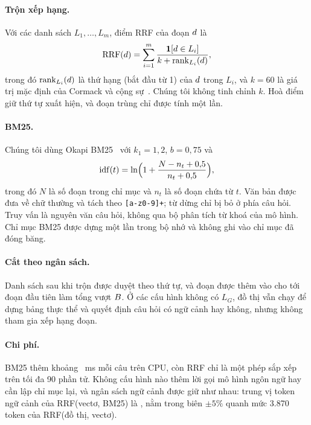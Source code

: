 \paragraph{Trộn xếp hạng.}
Với các danh sách $L_1,\dots,L_m$, điểm RRF của đoạn $d$ là
\begin{equation}\label{eq:rrf}
  \mathrm{RRF}(d) = \sum_{i=1}^{m} \frac{\mathbf{1}[d \in L_i]}{k + \operatorname{rank}_{L_i}(d)},
\end{equation}
trong đó $\operatorname{rank}_{L_i}(d)$ là thứ hạng (bắt đầu từ 1) của $d$ trong $L_i$, và $k=60$ là giá trị mặc định của Cormack và cộng sự~\cite{cormack2009rrf}.
Chúng tôi không tinh chỉnh $k$. Hoà điểm giữ thứ tự xuất hiện, và đoạn trùng chỉ được tính một lần.

\paragraph{BM25.}
Chúng tôi dùng Okapi BM25~\cite{robertson2009bm25} với $k_1 = 1{,}2$, $b = 0{,}75$ và
\begin{equation}\label{eq:idf}
  \mathrm{idf}(t) = \ln\Bigl(1 + \frac{N - n_t + 0{,}5}{n_t + 0{,}5}\Bigr),
\end{equation}
trong đó $N$ là số đoạn trong chỉ mục và $n_t$ là số đoạn chứa từ $t$.
Văn bản được đưa về chữ thường và tách theo \texttt{[a-z0-9]+}; từ dừng chỉ bị bỏ ở phía câu hỏi.
Truy vấn là nguyên văn câu hỏi, không qua bộ phân tích từ khoá của mô hình. Chỉ mục BM25 được dựng một lần trong bộ nhớ và không ghi vào chỉ mục đã đóng băng.

\paragraph{Cắt theo ngân sách.}
Danh sách sau khi trộn được duyệt theo thứ tự, và đoạn được thêm vào cho tới đoạn đầu tiên làm tổng vượt $B$.
Ở các cấu hình không có $L_G$, đồ thị vẫn chạy để dựng bảng thực thể và quyết định câu hỏi có ngữ cảnh hay không, nhưng không tham gia xếp hạng đoạn.

\paragraph{Chi phí.}
BM25 thêm khoảng \bmMs{}~ms mỗi câu trên CPU, còn RRF chỉ là một phép sắp xếp trên tối đa 90 phần tử.
Không cấu hình nào thêm lời gọi mô hình ngôn ngữ hay cần lập chỉ mục lại, và ngân sách ngữ cảnh được giữ như nhau: trung vị token ngữ cảnh của RRF(vectơ, BM25) là \tokVK{}, nằm trong biên $\pm 5\%$ quanh mức 3.870 token của RRF(đồ thị, vectơ).

